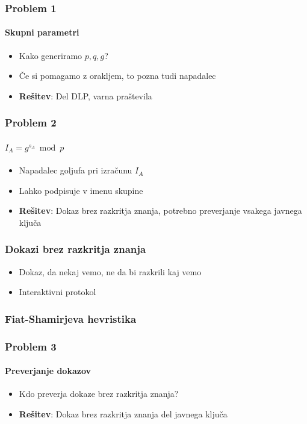 \documentclass{beamer}    %
\begin{document}
\begin{frame}
    \frametitle{Problem 1}
    \framesubtitle{Skupni parametri}
    \begin{itemize}
        \item Kako generiramo $p, q, g$?
        \item Če si pomagamo z orakljem, to pozna tudi napadalec
        \vspace{1cm}
        \item \textbf{Rešitev}: Del DLP, varna praštevila
    \end{itemize}
\end{frame}

\begin{frame}
    \frametitle{Problem 2}
    \framesubtitle{$I_A = g^{s_A} \bmod p$}
    \begin{itemize}
        \item Napadalec goljufa pri izračunu $I_A$
        \item Lahko podpisuje v imenu skupine
        \vspace{1cm}
        \item \textbf{Rešitev}: Dokaz brez razkritja znanja, potrebno preverjanje 
                vsakega javnega ključa
    \end{itemize}
\end{frame}

\begin{frame}
    \frametitle{Dokazi brez razkritja znanja}
    \begin{itemize}
        \item Dokaz, da nekaj vemo, ne da bi razkrili kaj vemo
        \item Interaktivni protokol
    \end{itemize}
\end{frame}

\begin{frame}
    \frametitle{Fiat-Shamirjeva hevristika}
\end{frame}

\begin{frame}
    \frametitle{Problem 3}
    \framesubtitle{Preverjanje dokazov}
    \begin{itemize}
        \item Kdo preverja dokaze brez razkritja znanja?
        \vspace{1cm}
        \item \textbf{Rešitev}: Dokaz brez razkritja znanja del javnega ključa
    \end{itemize}
\end{frame}
\end{document}
